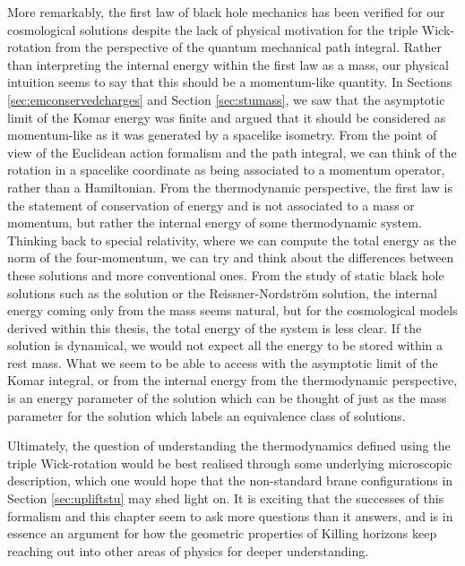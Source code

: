 More remarkably, the first law of black hole mechanics has been verified for our cosmological solutions despite the lack of physical motivation for the triple Wick-rotation from the perspective of the quantum mechanical path integral. Rather than interpreting the internal energy within the first law as a mass, our physical intuition seems to say that this should be a momentum-like quantity. In Sections \ref{sec:emconservedcharges} and Section \ref{sec:stumass}, we saw that the asymptotic limit of the Komar energy was finite and argued that it should be considered as momentum-like as it was generated by a spacelike isometry. From the point of view of the Euclidean action formalism and the path integral, we can think of the rotation in a spacelike coordinate as being associated to a momentum operator, rather than a Hamiltonian. From the thermodynamic perspective, the first law is the statement of conservation of energy and is not associated to a mass or momentum, but rather the internal energy of some thermodynamic system. Thinking back to special relativity, where we can compute the total energy as the norm of the four-momentum, we can try and think about the differences between these solutions and more conventional ones. From the study of static black hole solutions such as the \sch solution or the Reissner-Nordstr\"om solution, the internal energy coming only from the mass seems natural, but for the cosmological models derived within this thesis, the total energy of the system is less clear. If the solution is dynamical, we would not expect all the energy to be stored within a rest mass. What we seem to be able to access with the asymptotic limit of the Komar integral, or from the internal energy from the thermodynamic perspective, is an energy parameter of the solution which can be thought of just as the mass parameter for the \sch solution which labels an equivalence class of solutions.

Ultimately, the question of understanding the thermodynamics defined using the triple Wick-rotation would be best realised through some underlying microscopic description, which one would hope that the non-standard brane configurations in Section \ref{sec:upliftstu} may shed light on. It is exciting that the successes of this formalism and this chapter seem to ask more questions than it answers, and is in essence an argument for how the geometric properties of Killing horizons keep reaching out into other areas of physics for deeper understanding.

